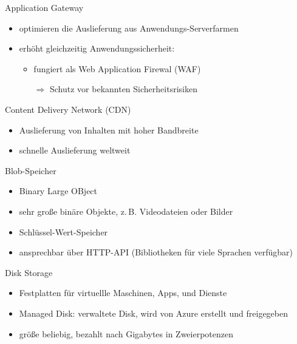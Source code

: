 \begin{flashcard}[Definition]{Application Gateway}
    \begin{itemize}
        \item optimieren die Auslieferung aus Anwendungs-Serverfarmen
        \item erhöht gleichzeitig Anwendungssicherheit:
        \begin{itemize}
            \item fungiert als Web Application Firewal (WAF)
            \item[$\Rightarrow$] Schutz vor bekannten Sicherheitsrisiken
        \end{itemize}
    \end{itemize}

\end{flashcard}

\begin{flashcard}[Definition]{Content Delivery Network (CDN)}
    \begin{itemize}
        \item Auslieferung von Inhalten mit hoher Bandbreite
        \item schnelle Auslieferung weltweit
    \end{itemize}
\end{flashcard}

\begin{flashcard}[Definition]{Blob-Speicher}
    \begin{itemize}
        \item Binary Large OBject
        \item sehr große binäre Objekte, z.\,B. Videodateien oder Bilder
        \item Schlüssel-Wert-Speicher
        \item ansprechbar über HTTP-API (Bibliotheken für viele Sprachen verfügbar)
    \end{itemize}

\end{flashcard}

\begin{flashcard}[Definition]{Disk Storage}
    \begin{itemize}
        \item Festplatten für virtuellle Maschinen, Apps, und Dienste
        \item Managed Disk: verwaltete Disk, wird von Azure erstellt und freigegeben
        \item größe beliebig, bezahlt nach Gigabytes in Zweierpotenzen
    \end{itemize}
\end{flashcard}

